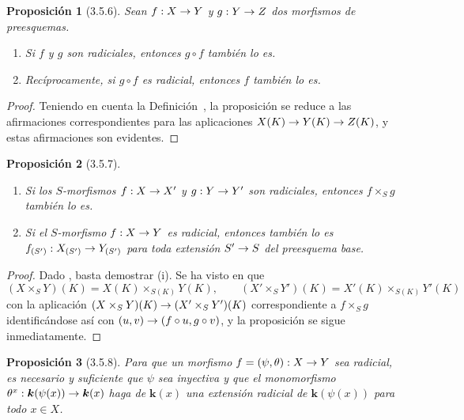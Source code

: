\documentclass[oneside]{amsart}
\theoremstyle{ega-env-style}
\theoremstyle{ega-thm-env-style}
\newtheorem*{proposition}{Proposición}
\theoremstyle{ega-defn-env-style}
\renewcommand{\to}{\mathchoice{\longrightarrow}{\rightarrow}{\rightarrow}{\rightarrow}}
\let\EGAOriginalLabel\label
\renewcommand{\label}[1]{\phantomsection\EGAOriginalLabel{#1}}
\begin{document}
\par\medskip
\begin{proposition}[3.5.6]
\label{I.3.5.6}
Sean $f:X\to Y$ y $g:Y\to Z$ dos morfismos de preesquemas.
\begin{enumerate}
  \item[{\rm(i)}] Si $f$ y $g$ son radiciales, entonces $g\circ f$ también lo es.
  \item[{\rm(ii)}] Recíprocamente, si $g\circ f$ es radicial, entonces $f$ también lo es.
\end{enumerate}
\end{proposition}

\begin{proof}
Teniendo en cuenta la Definición~, la proposición se reduce a las afirmaciones correspondientes para las aplicaciones $X(K)\to Y(K)\to Z(K)$, y estas afirmaciones son evidentes.
\end{proof}

\begin{proposition}[3.5.7]
\label{I.3.5.7}
\medskip\noindent
\begin{enumerate}
  \item[{\rm(i)}] Si los $S$-morfismos $f:X\to X'$ y $g:Y\to Y'$ son radiciales, entonces $f\times_S g$ también lo es.
  \item[{\rm(ii)}] Si el $S$-morfismo $f:X\to Y$ es radicial, entonces también lo es $f_{(S')}:X_{(S')}\to Y_{(S')}$ para toda extensión $S'\to S$ del preesquema base.
\end{enumerate}
\end{proposition}

\begin{proof}
Dado , basta demostrar (i).
Se ha visto en  que
\label{I.3.5.7.field-valued-product-fr}
\[
  (X\times_S Y)(K)=X(K)\times_{S(K)}Y(K),\qquad
  (X'\times_S Y')(K)=X'(K)\times_{S(K)}Y'(K)
\]
con la aplicación $(X\times_S Y)(K)\to(X'\times_S Y')(K)$ correspondiente a $f\times_S g$ identificándose así con $(u,v)\to(f\circ u,g\circ v)$, y la proposición se sigue inmediatamente.
\end{proof}

\begin{proposition}[3.5.8]
\label{I.3.5.8}
Para que un morfismo $f=(\psi,\theta):X\to Y$ sea radicial, es necesario y suficiente que $\psi$ sea inyectiva y que el monomorfismo $\theta^x:\boldsymbol{k}(\psi(x))\to\boldsymbol{k}(x)$ haga de $\boldsymbol{k}(x)$ una extensión radicial de $\boldsymbol{k}(\psi(x))$ para todo $x\in X$.
\end{proposition}
\end{document}
